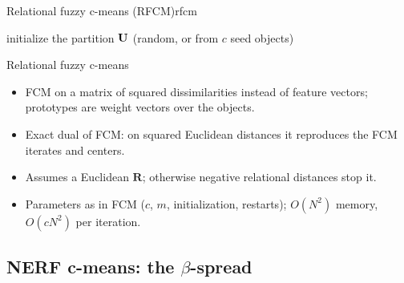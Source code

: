 \begin{algobox}{Relational fuzzy c-means (RFCM)}{rfcm}
\begin{algorithm}[H]
initialize the partition $\mathbf{U}$ (random, or from $c$ seed objects)\;
\end{algorithm}
\end{algobox}
\begin{summarybox}{Relational fuzzy c-means}
\begin{itemize}
  \item FCM on a matrix of squared dissimilarities instead of feature vectors; prototypes are weight vectors over the objects.
  \item Exact dual of FCM: on squared Euclidean distances it reproduces the FCM iterates and centers.
  \item Assumes a Euclidean $\mathbf{R}$; otherwise negative relational distances stop it.
  \item Parameters as in FCM ($c$, $m$, initialization, restarts); $O(N^2)$ memory, $O(cN^2)$ per iteration.
\end{itemize}
\end{summarybox}

\subsection{NERF c-means: the \texorpdfstring{$\beta$}{beta}-spread}\label{sec:rel:nerf}

